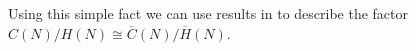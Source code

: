 \documentclass[10pt]{amsart}
\theoremstyle{plain}
\theoremstyle{definition}
\theoremstyle{remark}%
\newcommand{\Z}{\mathbb{Z}}
\newcommand{\C}{\mathbb{C}}
\newcommand{\Ad}{\mathrm{Ad}}
\renewcommand{\P}{\mathcal{P}}
\begin{document}

Using this simple fact we can use results in  \cite{HPPT02, KorbTolar10, KorbTolar12, TolarJPCS18} to describe the factor $C(N)/H(N)\cong \overline{C}(N)/\overline{H}(N)$. 
\end{document}
